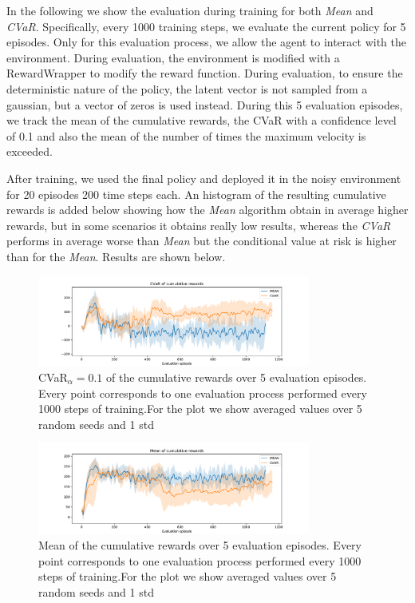 In the following we show the evaluation during training for both \textit{Mean} and
\textit{CVaR}.
Specifically, every 1000 training steps, we evaluate the current policy for 5 episodes.
Only for this evaluation process, we allow the agent to interact with the environment.
During evaluation, the environment is modified with a RewardWrapper to modify
the reward function.
During evaluation, to ensure the deterministic nature of the policy, 
the latent vector is not sampled from a gaussian, but a vector of zeros is used instead.
During this 5 evaluation episodes, we track the mean of the cumulative rewards,
the CVaR with a confidence level of 0.1 and also the mean of the number of times the 
maximum velocity is exceeded.

After training, we used the final policy and deployed it in the noisy environment for 20 episodes 
200 time steps each. An histogram of the resulting cumulative rewards is added below showing
how the \textit{Mean} algorithm obtain in average higher rewards, but in some scenarios it 
obtains really low results, whereas the \textit{CVaR} performs in average worse than \textit{Mean} 
but the conditional value at risk is higher than for the \textit{Mean}.
Results are shown below.




\begin{figure}[ht]
        \centering
        \includegraphics[width=0.8\textwidth]{images/Cheetah_offpolicy_medium/cvar_train_withstds.pdf}
        \caption{CVaR$_\alpha=0.1$ of the cumulative rewards over 5 evaluation episodes.
        Every point corresponds to one evaluation process performed every 1000 steps of training.For the plot we
        show averaged values over 5 random seeds and 1 std}
        \label{fig:cvar_cheetah}
    
\end{figure}

\begin{figure}[ht]
    \centering
    \includegraphics[width=0.8\textwidth]{images/Cheetah_offpolicy_medium/mean_train_withstds.pdf}
    \caption{Mean of the cumulative rewards over 5 evaluation episodes. Every point corresponds
    to one evaluation process performed every 1000 steps of training.For the plot we
    show averaged values over 5 random seeds and 1 std}
    \label{fig:mean_cheetah}

\end{figure}



